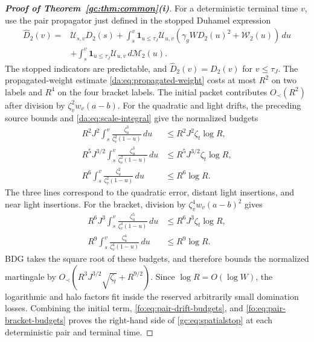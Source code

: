 \documentclass[11pt]{article}
\numberwithin{equation}{section}
\theoremstyle{remark}
\begin{document}
\begin{proof}[\textbf{Proof of Theorem~\ref{gc:thm:common}(i)}]
For a deterministic terminal time $v$, use the pair propagator just
defined in the stopped Duhamel expression
\[
 \begin{aligned}
 \widehat D_2(v)={}&\mathcal U_{s,v}D_2(s)
 +\int_s^v\mathbf1_{u\le\tau_J}\mathcal U_{u,v}
       (\gamma_gW D_2(u)^2+\mathcal W_2(u))\,du\\
 &+\int_s^v\mathbf1_{u\le\tau_J}\mathcal U_{u,v}\,d\mathcal M_2(u).
 \end{aligned}
\]
The stopped indicators are predictable, and
$\widehat D_2(v)=D_2(v)$ for $v\le\tau_J$.
The propagated-weight estimate \eqref{da:eq:propagated-weight} costs
at most $R^2$ on two labels and $R^4$ on the four bracket labels.
The initial packet contributes $O_\prec(R^2)$ after division by
$\zeta_v^2w_v(a-b)$. For the quadratic and light drifts, the preceding
source bounds and \eqref{da:eq:scale-integral} give the normalized
budgets
\begin{equation}\label{fo:eq:pair-drift-budgets}
 \begin{aligned}
 R^2J^2\int_s^v\frac{\zeta_u^3}{\zeta_v^2(1-u)}\,du
     &\le R^2J^2\zeta_t\log R,\\
 R^5J^{3/2}\int_s^v\frac{\zeta_u^3}{\zeta_v^2(1-u)}\,du
     &\le R^5J^{3/2}\zeta_t\log R,\\
 R^6\int_s^v\frac{\zeta_u^2}{\zeta_v^2(1-u)}\,du
     &\le R^6\log R.
 \end{aligned}
\end{equation}
The three lines correspond to the quadratic error, distant light
insertions, and near light insertions. For the bracket, division by
$\zeta_v^4w_v(a-b)^2$ gives
\begin{equation}\label{fo:eq:pair-bracket-budgets}
 \begin{aligned}
 R^6J^3\int_s^v\frac{\zeta_u^5}{\zeta_v^4(1-u)}\,du
     &\le R^6J^3\zeta_t\log R,\\
 R^9\int_s^v\frac{\zeta_u^4}{\zeta_v^4(1-u)}\,du
     &\le R^9\log R.
 \end{aligned}
\end{equation}
BDG takes the square root of these budgets, and therefore bounds the
normalized martingale by
$O_\prec(R^3J^{3/2}\sqrt{\zeta_t}+R^{9/2})$.
Since $\log R=O(\log W)$, the logarithmic and halo factors fit inside
the reserved arbitrarily small domination losses. Combining the initial
term, \eqref{fo:eq:pair-drift-budgets}, and
\eqref{fo:eq:pair-bracket-budgets} proves the right-hand side of
\eqref{gc:eq:spatialstop} at each deterministic pair and terminal time.


\end{proof}
\end{document}
